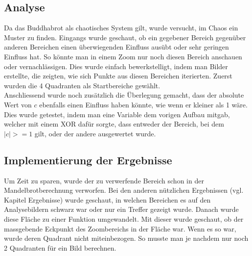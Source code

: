 \subsection{Analyse}
Da das Buddhabrot als chaotisches System gilt, wurde versucht, im Chaos ein Muster zu finden. Eingangs wurde geschaut, ob ein gegebener Bereich gegenüber anderen Bereichen einen überwiegenden Einfluss ausübt oder sehr geringen Einfluss hat. So könnte man in einem Zoom nur noch diesen Bereich anschauen oder vernachlässigen. Dies wurde einfach bewerkstelligt, indem man Bilder erstellte, die zeigten, wie sich Punkte aus diesen Bereichen iterierten. Zuerst wurden die 4 Quadranten als Startbereiche gewählt.
\\
Anschliessend wurde noch zusätzlich die Überlegung gemacht, dass der absolute Wert von $c$ ebenfalls einen Einfluss haben könnte, wie wenn er kleiner als 1 wäre. Dies wurde getestet, indem man eine Variable dem vorigen Aufbau mitgab, welcher mit einem XOR dafür sorgte, dass entweder der Bereich, bei dem $|c|>=1$ gilt, oder der andere ausgewertet wurde.
\subsection{Implementierung der Ergebnisse}
Um Zeit zu sparen, wurde der zu verwerfende Bereich schon in der Mandelbrotberechnung verworfen. Bei den anderen nützlichen Ergebnissen (vgl. Kapitel Ergebnisse) wurde geschaut, in welchen Bereichen es auf den Analysebildern schwarz war oder nur ein Treffer gezeigt wurde. Danach wurde diese Fläche zu einer Funktion umgewandelt. Mit dieser wurde geschaut, ob der massgebende Eckpunkt des Zoombereichs in der Fläche war. Wenn es so war, wurde deren Quadrant nicht miteinbezogen. So musste man je nachdem nur noch 2 Quadranten für ein Bild berechnen.